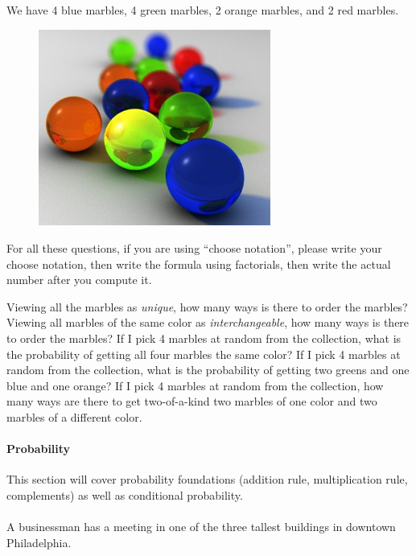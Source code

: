 \documentclass[12pt]{article}
\begin{document}
\problem We have 4 blue marbles, 4 green marbles, 2 orange marbles, and 2 red marbles.

\begin{figure}[htp]
\centering
\includegraphics[width=3in, height=2.54in]{marbles.jpg}
\end{figure}
\FloatBarrier

\pagebreak
\noindent For all these questions, if you are using ``choose notation'', please write your choose notation, then write the formula using factorials, then write the actual number after you compute it.

\begin{enumerate}
\easysubproblem Viewing all the marbles as \textit{unique}, how many ways is there to order the marbles?
\easysubproblem Viewing all marbles of the same color as \textit{interchangeable}, how many ways is there to order the marbles?
\intermediatesubproblem If I pick 4 marbles at random from the collection, what is the probability of getting all four marbles the same color?
\intermediatesubproblem If I pick 4 marbles at random from the collection, what is the probability of getting two greens and one blue and one orange?
\extracreditsubproblem If I pick 4 marbles at random from the collection, how many ways are there to get two-of-a-kind \ie two marbles of one color and two marbles of a different color.
\end{enumerate}

\paragraph{Probability} This section will cover probability foundations (addition rule, multiplication rule, complements) as well as conditional probability. \\ \\

\problem A businessman has a meeting in one of the three tallest buildings in downtown Philadelphia.
\end{document}
